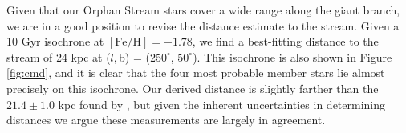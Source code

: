 \documentclass{emulateapj}
\begin{document}

Given that our Orphan Stream stars cover a wide range along the giant branch, we are in a good position to revise the distance estimate to the stream. Given a 10 Gyr \citet{Girardi;et-al_2008} isochrone at $[\mbox{Fe/H}] = -1.78$, we find a best-fitting distance to the stream of 24 kpc at ($l, $b) = ($250^\circ$, $50^\circ$). This isochrone is also shown in Figure \ref{fig:cmd}, and it is clear that the four most probable member stars lie almost precisely on this isochrone. Our derived distance is slightly farther than the $21.4 \pm 1.0$ kpc found by \citet{Newberg;et-al_2010}, but given the inherent uncertainties in determining distances we argue these measurements are largely in agreement.
\end{document}
